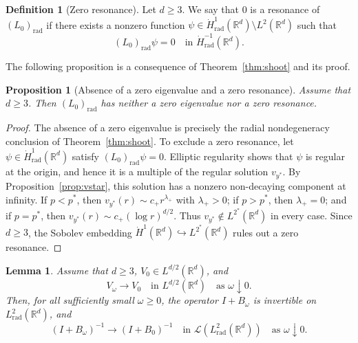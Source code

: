 \documentclass[12pt, a4paper, reqno]{amsart}
\numberwithin{equation}{section}
\newtheorem{proposition}[theorem]{Proposition}
\newtheorem{lemma}[theorem]{Lemma}
\theoremstyle{definition}
\newtheorem{definition}[theorem]{Definition}
\theoremstyle{remark}
\newcommand{\R}{\mathbb R}
\newcommand{\rad}{\mathrm{rad}}
\begin{document}
\begin{definition}[Zero resonance]\label{def:res}
Let $d\ge3$. We say that $0$ is a resonance of $(L_0)_{\rad}$ if there
exists a nonzero function
$\psi\in\dot H^1_{\rad}(\R^d)\setminus L^2(\R^d)$ such that
\[
  (L_0)_{\rad}\psi=0
  \quad\text{in }\dot H^{-1}_{\rad}(\R^d).
\]
\end{definition}

The following proposition is a consequence of
Theorem~\ref{thm:shoot} and its proof.

\begin{proposition}[Absence of a zero eigenvalue and a zero resonance]
\label{prop:noz}
Assume that $d\ge3$. Then $(L_0)_{\rad}$ has neither a zero eigenvalue nor a
zero resonance.
\end{proposition}

\begin{proof}
The absence of a zero eigenvalue is precisely the radial nondegeneracy
conclusion of Theorem~\ref{thm:shoot}. To exclude a zero
resonance, let $\psi\in\dot H^1_{\rad}(\R^d)$ satisfy
$(L_0)_{\rad}\psi=0$. Elliptic regularity shows that $\psi$ is regular at
the origin, and hence it is a multiple of the regular solution $v_{y^*}$.
By Proposition~\ref{prop:vstar}, this solution has a nonzero
non-decaying component at infinity. If $p<p^*$, then
$v_{y^*}(r)\sim c_+r^{\lambda_+}$ with $\lambda_+>0$; if $p>p^*$, then
$\lambda_+=0$; and if $p=p^*$, then
$v_{y^*}(r)\sim c_+(\log r)^{d/2}$. Thus
$v_{y^*}\notin L^{2^*}(\R^d)$ in every case. Since $d\ge3$, the Sobolev
embedding $\dot H^1(\R^d)\hookrightarrow L^{2^*}(\R^d)$ rules out a zero resonance.
\end{proof}

\begin{lemma}\label{lem:Kinv}
Assume that $d\ge3$, $V_0\in L^{d/2}(\R^d)$, and
\[
  V_\omega\to V_0
  \quad\text{in }L^{d/2}(\R^d)
  \quad\text{as }\omega\downarrow0.
\]
Then, for all sufficiently small $\omega\ge0$, the operator $I+B_\omega$
is invertible on $L^2_{\rad}(\R^d)$, and
\[
  (I+B_\omega)^{-1}
  \to(I+B_0)^{-1}
  \quad\text{in }\mathcal{L}(L^2_{\rad}(\R^d))
  \quad\text{as }\omega\downarrow0.
\]
\end{lemma}
\end{document}
